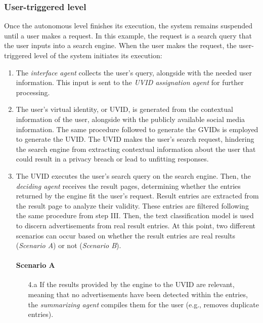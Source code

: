 \subsubsection*{User-triggered level}
Once the autonomous level finishes its execution, the system remains suspended until a user makes a request. In this example, the request is a search query that the user inputs into a search engine. When the user makes the request, the user-triggered level of the system initiates its execution:
\begin{enumerate}
    \item The \textit{interface agent} collects the user's query, alongside with the needed user information. This input is sent to the \textit{UVID assignation agent} for further processing.
    
    \item The user's virtual identity, or UVID, is generated from the contextual information of the user, alongside with the publicly available social media information. The same procedure followed to generate the GVIDs is employed to generate the UVID. The UVID makes the user's search request, hindering the search engine from extracting contextual information about the user that could result in a privacy breach or lead to unfitting responses.
    
    \item The UVID executes the user's search query on the search engine. Then, the \textit{deciding agent} receives the result pages, determining whether the entries returned by the engine fit the user's request. Result entries are extracted from the result page to analyze their validity. These entries are filtered following the same procedure from step III. Then, the text classification model is used to discern advertisements from real result entries. At this point, two different scenarios can occur based on whether the result entries are real results (\textit{Scenario A}) or not (\textit{Scenario B}). 
    
    \paragraph{Scenario A}
    \begin{enumerate}
        \item [4.a] If the results provided by the engine to the UVID are relevant, meaning that no advertisements have been detected within the entries, the \textit{summarizing agent} compiles them for the user (e.g., removes duplicate entries).
        

\end{enumerate}
\end{enumerate}
